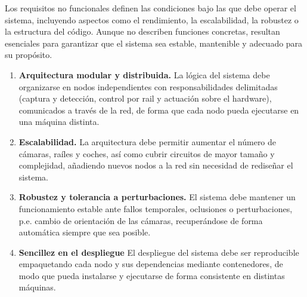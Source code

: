 Los requisitos no funcionales definen las condiciones bajo las que debe operar el sistema, incluyendo aspectos como el rendimiento, la escalabilidad, la robustez o la estructura del código. Aunque no describen funciones concretas, resultan esenciales para garantizar que el sistema sea estable, mantenible y adecuado para su propósito.

\begin{enumerate}
\item \textbf{Arquitectura modular y distribuida.} La lógica del sistema debe organizarse en nodos independientes con responsabilidades delimitadas (captura y detección, control por rail y actuación sobre el hardware), comunicados a través de la red, de forma que cada nodo pueda ejecutarse en una máquina distinta.

\item \textbf{Escalabilidad.} La arquitectura debe permitir aumentar el número de cámaras, raíles y coches, así como cubrir circuitos de mayor tamaño y complejidad, añadiendo nuevos nodos a la red sin necesidad de rediseñar el sistema.

\item \textbf{Robustez y tolerancia a perturbaciones.} El sistema debe mantener un funcionamiento estable ante fallos temporales, oclusiones o perturbaciones, p.e. cambio de orientación de las cámaras, recuperándose de forma automática siempre que sea posible.

\item \textbf{Sencillez en el despliegue} El despliegue del sistema debe ser reproducible empaquetando cada nodo y sus dependencias mediante contenedores, de modo que pueda instalarse y ejecutarse de forma consistente en distintas máquinas.
\end{enumerate}

%

